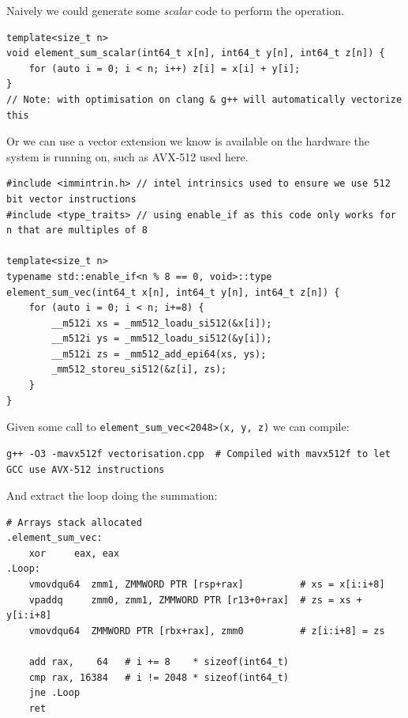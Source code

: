 Naively we could generate some \textit{scalar} code to perform the operation.
\begin{verbatim}
template<size_t n>
void element_sum_scalar(int64_t x[n], int64_t y[n], int64_t z[n]) {
    for (auto i = 0; i < n; i++) z[i] = x[i] + y[i];
}
// Note: with optimisation on clang & g++ will automatically vectorize this
\end{verbatim}
Or we can use a vector extension we know is available on the hardware the system is running on, such as AVX-512 used here.
\begin{verbatim}
#include <immintrin.h> // intel intrinsics used to ensure we use 512 bit vector instructions
#include <type_traits> // using enable_if as this code only works for n that are multiples of 8

template<size_t n>
typename std::enable_if<n % 8 == 0, void>::type 
element_sum_vec(int64_t x[n], int64_t y[n], int64_t z[n]) { 
    for (auto i = 0; i < n; i+=8) {
        __m512i xs = _mm512_loadu_si512(&x[i]);
        __m512i ys = _mm512_loadu_si512(&y[i]);
        __m512i zs = _mm512_add_epi64(xs, ys);
        _mm512_storeu_si512(&z[i], zs);
    }
}
\end{verbatim}
Given some call to \texttt{element_sum_vec<2048>(x, y, z)} we can compile:
\begin{verbatim}
g++ -O3 -mavx512f vectorisation.cpp  # Compiled with mavx512f to let GCC use AVX-512 instructions
\end{verbatim}
And extract the loop doing the summation:
\begin{verbatim}
# Arrays stack allocated
.element_sum_vec:
    xor     eax, eax
.Loop:
    vmovdqu64  zmm1, ZMMWORD PTR [rsp+rax]          # xs = x[i:i+8]
    vpaddq     zmm0, zmm1, ZMMWORD PTR [r13+0+rax]  # zs = xs + y[i:i+8]
    vmovdqu64  ZMMWORD PTR [rbx+rax], zmm0          # z[i:i+8] = zs

    add rax,    64   # i += 8    * sizeof(int64_t)
    cmp rax, 16384   # i != 2048 * sizeof(int64_t)
    jne .Loop
    ret
\end{verbatim}

